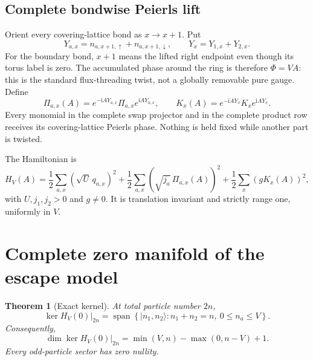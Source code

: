 \documentclass[11pt]{article}
\newtheorem{theorem}{Theorem}[section]
\theoremstyle{remark}
\newcommand{\Span}{\operatorname{span}}
\newcommand{\I}{\mathrm i}
\begin{document}
\subsection{Complete bondwise Peierls lift}

Orient every covering-lattice bond as $x\to x+1$.  Put
\begin{equation}
 Y_{a,x}=n_{a,x+1,\uparrow}+n_{a,x+1,\downarrow},
 \qquad
 Y_x=Y_{1,x}+Y_{2,x}.
\end{equation}
For the boundary bond, $x+1$ means the lifted right endpoint even though its
torus label is zero.  The accumulated phase around the ring is therefore
$\Phi=VA$: this is the standard flux-threading twist, not a globally removable
pure gauge.  Define
\begin{equation}
 \Pi_{a,x}(A)
 =e^{-\I AY_{a,x}}\Pi_{a,x}e^{\I AY_{a,x}},
 \qquad
 K_x(A)=e^{-\I AY_x}K_xe^{\I AY_x}.
 \label{eq:bond-peierls}
\end{equation}
Every monomial in the complete swap projector and in the complete product row
receives its covering-lattice Peierls phase.  Nothing is held fixed while
another part is twisted.

The Hamiltonian is
\begin{equation}
 \boxed{
 H_V(A)=
 \frac12\sum_{a,x}(\sqrt U\,q_{a,x})^2
 +\frac12\sum_{a,x}(\sqrt{j_a}\,\Pi_{a,x}(A))^2
 +\frac12\sum_x(gK_x(A))^2,}
 \label{eq:escape-H}
\end{equation}
with $U,j_1,j_2>0$ and $g\ne0$.  It is translation invariant and strictly
range one, uniformly in $V$.

\section{Complete zero manifold of the escape model}

\begin{theorem}[Exact kernel]
\label{thm:escape-kernel}
At total particle number $2n$,
\begin{equation}
 \boxed{
 \ker H_V(0)|_{2n}
 =\Span\left\{
 |n_1,n_2\rangle:
 n_1+n_2=n,\ 0\le n_a\le V
 \right\}.}
 \label{eq:escape-kernel}
\end{equation}
Consequently,
\begin{equation}
 \boxed{
 \dim\ker H_V(0)|_{2n}
 =\min(V,n)-\max(0,n-V)+1.}
 \label{eq:escape-nullity}
\end{equation}
Every odd-particle sector has zero nullity.
\end{theorem}
\end{document}
